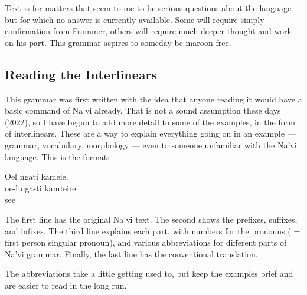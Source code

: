 Text  is for matters that seem to me to be serious
questions about the language but for which no answer is currently
available.  Some will require simply confirmation from Frommer, others
will require much deeper thought and work on his part.  This grammar
aspires to someday be maroon-free.


\subsection{Reading the Interlinears}
This grammar was first written with the idea that anyone reading it
would have a basic command of Na'vi already.  That is not a sound
assumption these days (2022), so I have begun to add more detail to
some of the examples, in the form of interlinears.  These are a way to
explain everything going on in an example — grammar, vocabulary,
morpho\-lo\-gy — even to someone unfamiliar with the Na'vi language.  This
is the format:

\begin{interlin}
 \glll Oel ngati kameie. \\
     oe-l nga-ti kam‹ei›e \\
       see \\
\end{interlin}

\noindent The first line has the original Na'vi text.  The second
shows the prefixes, suffixes, and infixes.  The third line explains
each part, with numbers for the pronouns ( = first person
singular pronoun), and various abbreviations for different parts of
Na'vi grammar.  Finally, the last line has the conventional
translation. 

The abbreviations take a little getting used to, but keep the examples
brief and are easier to read in the long run.

